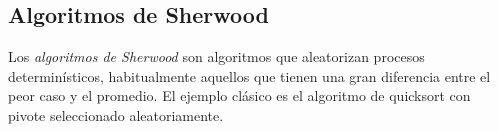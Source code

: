 \subsection{Algoritmos de Sherwood}

Los \textit{algoritmos de Sherwood} son algoritmos que aleatorizan procesos determinísticos, habitualmente aquellos que tienen una gran diferencia entre el peor caso y el promedio. El ejemplo clásico es el algoritmo de quicksort con pivote seleccionado aleatoriamente.
